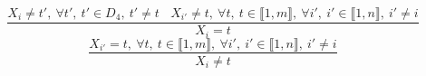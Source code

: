 $$\frac{X_{i} \neq t',~\forall t',~t' \in D_{4},~t' \neq t~~~~X_{i'} \neq t,~\forall t,~t \in \llbracket1,m\rrbracket,~\forall i',~i' \in \llbracket1,n\rrbracket,~i' \neq i}{X_{i}=t}$$ $$\frac{X_{i'}=t,~\forall t,~t \in \llbracket1,m\rrbracket,~\forall i',~i' \in \llbracket1,n\rrbracket,~i' \neq i}{X_{i} \neq t}$$ 